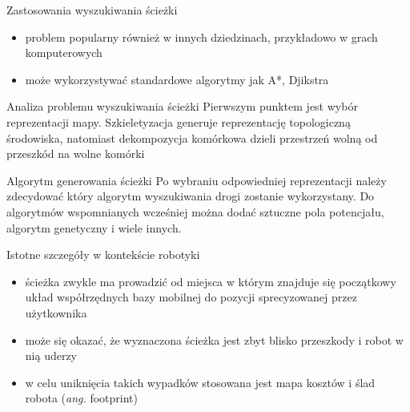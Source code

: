 \begin{frame}
{Zastosowania wyszukiwania ścieżki}
\begin{itemize}
	\item problem popularny również w innych dziedzinach, przykładowo w grach komputerowych
	\item może wykorzystywać standardowe algorytmy jak A*, Djikstra
\end{itemize}
\end{frame}

\begin{frame}
{Analiza problemu wyszukiwania ścieżki}
	Pierwszym punktem jest wybór reprezentacji mapy.
	Szkieletyzacja generuje reprezentację topologiczną środowiska, natomiast dekompozycja komórkowa dzieli przestrzeń wolną od przeszkód na wolne komórki	
\end{frame}

\begin{frame}
{Algorytm generowania ścieżki}
	Po wybraniu odpowiedniej reprezentacji należy zdecydować który algorytm wyszukiwania drogi zostanie wykorzystany.
	Do algorytmów wspomnianych wcześniej można dodać sztuczne pola potencjału, algorytm genetyczny i wiele innych.
\end{frame}

\begin{frame}
{Istotne szczegóły w kontekście robotyki}
	\begin{itemize}
		\item ścieżka zwykle ma prowadzić od miejsca w którym znajduje się początkowy układ współrzędnych bazy mobilnej do pozycji sprecyzowanej przez użytkownika
		\item może się okazać, że wyznaczona ścieżka jest zbyt blisko przeszkody i robot w nią uderzy
		\item w celu uniknięcia takich wypadków stosowana jest mapa kosztów i ślad robota (\textit{ang.} footprint)
	\end{itemize}
\end{frame}
